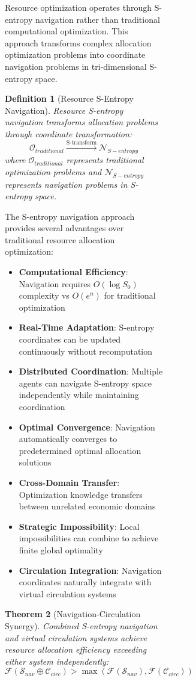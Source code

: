 \documentclass[12pt,a4paper]{article}
\newtheorem{theorem}{Theorem}
\newtheorem{definition}[theorem]{Definition}
\begin{document}
\begin{figure}[H]
\begin{figure}[H]
\begin{figure}[H]
Resource optimization operates through S-entropy navigation rather than traditional computational optimization. This approach transforms complex allocation optimization problems into coordinate navigation problems in tri-dimensional S-entropy space.

\begin{definition}[Resource S-Entropy Navigation]
Resource S-entropy navigation transforms allocation problems through coordinate transformation:
\begin{equation}
\mathcal{O}_{traditional} \xrightarrow{\text{S-transform}} \mathcal{N}_{S-entropy}
\end{equation}
where $\mathcal{O}_{traditional}$ represents traditional optimization problems and $\mathcal{N}_{S-entropy}$ represents navigation problems in S-entropy space.
\end{definition}

The S-entropy navigation approach provides several advantages over traditional resource allocation optimization:
\begin{itemize}
\item \textbf{Computational Efficiency}: Navigation requires $O(\log S_0)$ complexity vs $O(e^n)$ for traditional optimization
\item \textbf{Real-Time Adaptation}: S-entropy coordinates can be updated continuously without recomputation
\item \textbf{Distributed Coordination}: Multiple agents can navigate S-entropy space independently while maintaining coordination
\item \textbf{Optimal Convergence}: Navigation automatically converges to predetermined optimal allocation solutions
\item \textbf{Cross-Domain Transfer}: Optimization knowledge transfers between unrelated economic domains
\item \textbf{Strategic Impossibility}: Local impossibilities can combine to achieve finite global optimality
\item \textbf{Circulation Integration}: Navigation coordinates naturally integrate with virtual circulation systems
\end{itemize}

\begin{theorem}[Navigation-Circulation Synergy]
Combined S-entropy navigation and virtual circulation systems achieve resource allocation efficiency exceeding either system independently:
\begin{equation}
\mathcal{F}(\mathcal{S}_{nav} \oplus \mathcal{C}_{circ}) > \max(\mathcal{F}(\mathcal{S}_{nav}), \mathcal{F}(\mathcal{C}_{circ}))
\end{equation}
\end{theorem}


\end{figure}
\end{figure}
\end{figure}
\end{document}
